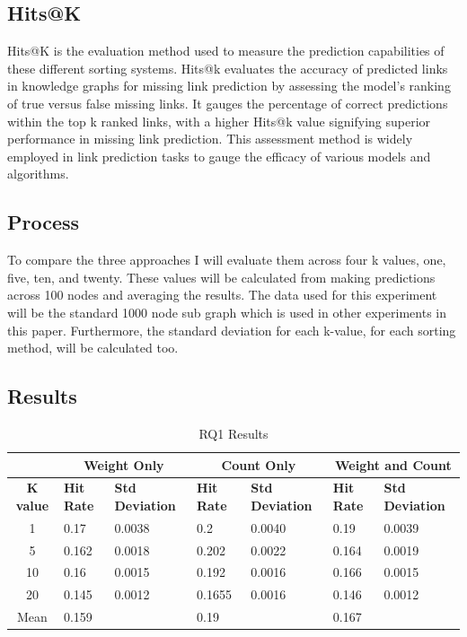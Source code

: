 \documentclass{l4proj}
\begin{document}
\subsection{Hits@K}

Hits@K is the evaluation method used to measure the prediction capabilities of these different sorting systems. Hits@k evaluates the accuracy of predicted links in knowledge graphs for missing link prediction by assessing the model's ranking of true versus false missing links. It gauges the percentage of correct predictions within the top k ranked links, with a higher Hits@k value signifying superior performance in missing link prediction. This assessment method is widely employed in link prediction tasks to gauge the efficacy of various models and algorithms. \\

\subsection{Process}

To compare the three approaches I will evaluate them across four k values, one, five, ten, and twenty. These values will be calculated from making predictions across 100 nodes and averaging the results. The data used for this experiment will be the standard 1000 node sub graph which is used in other experiments in this paper. Furthermore, the standard deviation for each k-value, for each sorting method, will be calculated too. \\

\subsection{Results}

\begin{table}[h]
\centering
\caption{RQ1 Results}
\label{tab:rq1_results}
\begin{tabular}{|c|l|l|l|l|l|l|}
\hline
& \multicolumn{2}{|c|}{\textbf{Weight Only}}  & \multicolumn{2}{c|}{\textbf{Count Only}} & \multicolumn{2}{|c|}{\textbf{Weight and Count}} \\ \hline
\textbf{K value} & \textbf{Hit Rate} & \textbf{Std Deviation} & \textbf{Hit Rate} & \textbf{Std Deviation} & \textbf{Hit Rate} & \textbf{Std Deviation}\\ \hline
1 & 0.17 & 0.0038 & 0.2 & 0.0040 & 0.19 & 0.0039\\ \hline
5 & 0.162 & 0.0018 & 0.202 & 0.0022 & 0.164 & 0.0019\\ \hline
10 & 0.16 & 0.0015 & 0.192 & 0.0016 & 0.166 & 0.0015 \\ \hline
20 & 0.145 & 0.0012 & 0.1655 & 0.0016 & 0.146 & 0.0012\\ \hline
Mean & 0.159 &  & 0.19 &  & 0.167 & \\ \hline
\end{tabular}
\end{table}
\end{document}
